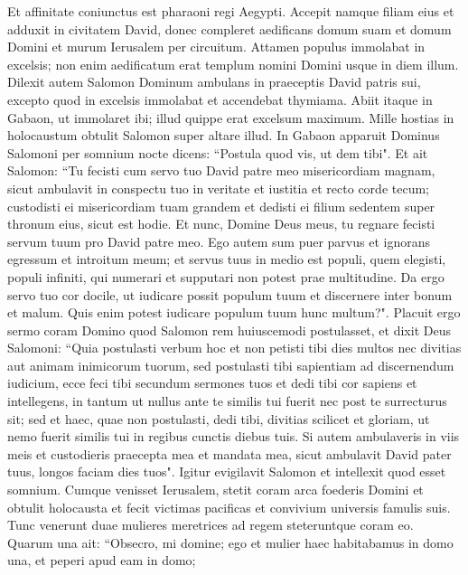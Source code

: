\begin{biblechapter}  
\verse Et affinitate coniunctus est pharaoni regi Aegypti. Accepit namque filiam eius et adduxit in civitatem David, donec compleret aedificans domum suam et domum Domini et murum Ierusalem per circuitum. 
\verse Attamen populus immolabat in excelsis; non enim aedificatum erat templum nomini Domini usque in diem illum. 
\verse Dilexit autem Salomon Dominum ambulans in praeceptis David patris sui, excepto quod in excelsis immolabat et accendebat thymiama. 
\verse Abiit itaque in Gabaon, ut immolaret ibi; illud quippe erat excelsum maximum. Mille hostias in holocaustum obtulit Salomon super altare illud. 
\verse In Gabaon apparuit Dominus Salomoni per somnium nocte dicens: “Postula quod vis, ut dem tibi". 
\verse Et ait Salomon: “Tu fecisti cum servo tuo David patre meo misericordiam magnam, sicut ambulavit in conspectu tuo in veritate et iustitia et recto corde tecum; custodisti ei misericordiam tuam grandem et dedisti ei filium sedentem super thronum eius, sicut est hodie. 
\verse Et nunc, Domine Deus meus, tu regnare fecisti servum tuum pro David patre meo. Ego autem sum puer parvus et ignorans egressum et introitum meum; 
\verse et servus tuus in medio est populi, quem elegisti, populi infiniti, qui numerari et supputari non potest prae multitudine. 
\verse Da ergo servo tuo cor docile, ut iudicare possit populum tuum et discernere inter bonum et malum. Quis enim potest iudicare populum tuum hunc multum?". 
\verse Placuit ergo sermo coram Domino quod Salomon rem huiuscemodi postulasset,  
\verse et dixit Deus Salomoni: “Quia postulasti verbum hoc et non petisti tibi dies multos nec divitias aut animam inimicorum tuorum, sed postulasti tibi sapientiam ad discernendum iudicium, 
\verse ecce feci tibi secundum sermones tuos et dedi tibi cor sapiens et intellegens, in tantum ut nullus ante te similis tui fuerit nec post te surrecturus sit; 
\verse sed et haec, quae non postulasti, dedi tibi, divitias scilicet et gloriam, ut nemo fuerit similis tui in regibus cunctis diebus tuis. 
\verse Si autem ambulaveris in viis meis et custodieris praecepta mea et mandata mea, sicut ambulavit David pater tuus, longos faciam dies tuos". 
\verse Igitur evigilavit Salomon et intellexit quod esset somnium. Cumque venisset Ierusalem, stetit coram arca foederis Domini et obtulit holocausta et fecit victimas pacificas et convivium universis famulis suis. 
\verse Tunc venerunt duae mulieres meretrices ad regem steteruntque coram eo. 
\verse Quarum una ait: “Obsecro, mi domine; ego et mulier haec habitabamus in domo una, et peperi apud eam in domo; 

\end{biblechapter}
